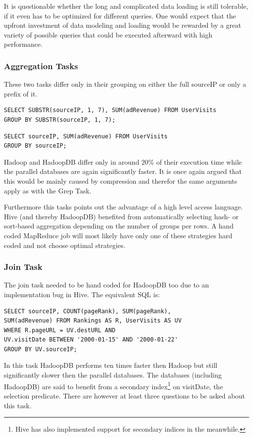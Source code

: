 \documentclass[12pt,a4paper]{scrartcl}		%
\begin{document}
It is questionable whether the long and complicated data loading is still tolerable, if it even has to be optimized for different queries. One would expect that the upfront investment of data modeling and loading would be rewarded by a great variety of possible queries that could be executed afterward with high performance.

\subsubsection{Aggregation Tasks}
These two tasks differ only in their grouping on either the full sourceIP or only a prefix of it.

\begin{verbatim}
SELECT SUBSTR(sourceIP, 1, 7), SUM(adRevenue) FROM UserVisits 
GROUP BY SUBSTR(sourceIP, 1, 7);
\end{verbatim}
\begin{verbatim}
SELECT sourceIP, SUM(adRevenue) FROM UserVisits 
GROUP BY sourceIP;
\end{verbatim}

Hadoop and HadoopDB differ only in around 20\% of their execution time while the parallel databases are again significantly faster. It is once again argued that this would be mainly caused by compression and therefor the same arguments apply as with the Grep Task.

Furthermore this tasks points out the advantage of a high level access language. Hive (and thereby HadoopDB) benefited from automatically selecting hash- or sort-based aggregation depending on the number of groups per rows. A hand coded MapReduce job will most likely have only one of these strategies hard coded and not choose optimal strategies.

\subsubsection{Join Task}
The join task needed to be hand coded for HadoopDB too due to an implementation bug in Hive. The equivalent SQL is:
\begin{verbatim}
SELECT sourceIP, COUNT(pageRank), SUM(pageRank),
SUM(adRevenue) FROM Rankings AS R, UserVisits AS UV
WHERE R.pageURL = UV.destURL AND
UV.visitDate BETWEEN '2000-01-15' AND '2000-01-22'
GROUP BY UV.sourceIP;
\end{verbatim}

In this task HadoopDB performs ten times faster then Hadoop but still significantly slower then the parallel databases. The databases (including HadoopDB) are said to benefit from a secondary index\footnote{Hive has also implemented support for secondary indices in the meanwhile.}
 on visitDate, the selection predicate. There are however at least three questions to be asked about this task.
\end{document}
